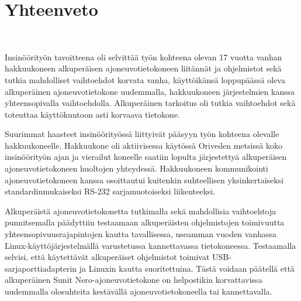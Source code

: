 

\newpage

\chapter{Yhteenveto}\


Insinöörityön tavoitteena oli selvittää työn kohteena olevan 17 vuotta vanhan hakkuukoneen alkuperäisen ajoneuvotietokoneen liitännät ja ohjelmistot sekä tutkia mahdolliset vaihtoehdot korvata vanha, käyttöikänsä loppupäässä oleva alkuperäinen ajoneuvotietokone uudemmalla, hakkuukoneen järjestelmien kanssa yhteensopivalla vaihtoehdolla. Alkuperäinen tarkoitus oli tutkia vaihtoehdot sekä toteuttaa käyttökuntoon asti korvaava tietokone.

Suurimmat haasteet insinöörityössä liittyivät pääsyyn työn kohteena olevalle hakkuukoneelle. Hakkuukone oli aktiivisessa käytössä Oriveden metsissä koko insinöörityön ajan ja vierailut koneelle saatiin lopulta järjestettyä alkuperäisen ajoneuvotietokoneen huoltojen yhteydessä. Hakkuukoneen kommunikointi ajoneuvotietokoneen kanssa osoittautui kuitenkin suhteellisen yksinkertaiseksi standardinmukaiseksi RS-232 sarjamuotoiseksi liikenteeksi.

Alkuperäistä ajoneuvotietokonetta tutkimalla sekä mahdollisia vaihtoehtoja punnitsemalla päädyttiin testaamaan alkuperäisten ohjelmistojen toimivuutta yhteensopivuusrajapintojen kautta tavallisessa, useamman vuoden vanhassa Linux-käyttöjärjestelmällä varustetussa kannettavassa tietokoneessa. Testaamalla selvisi, että käytettävät alkuperäiset ohjelmistot toimivat USB-sarjaporttiadapterin ja Linuxin kautta suoritettuina. Tästä voidaan päätellä että alkuperäinen Sunit Nero-ajoneuvotietokone on helpostikin korvattavissa uudemmalla olosuhteita kestävällä ajoneuvotietokoneella tai kannettavalla.

